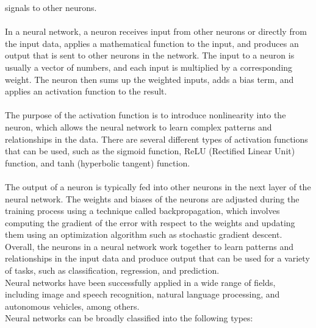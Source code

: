 signals to other neurons.\\
\\
In a neural network, a neuron receives input from other neurons or directly from the input data, applies a mathematical function to the input, and
produces an output that is sent to other neurons in the network. The input to a neuron is usually a vector of numbers, and each input is multiplied
by a corresponding weight. The neuron then sums up the weighted inputs, adds a bias term, and applies an activation function to the result.\\
\\
The purpose of the activation function is to introduce nonlinearity into the neuron, which allows the neural network to learn complex
patterns and relationships in the data. There are several different types of activation functions that can be used, such as the sigmoid function,
ReLU (Rectified Linear Unit) function, and tanh (hyperbolic tangent) function.\\
\\
The output of a neuron is typically fed into other neurons in the next layer of the neural network. The weights and biases of the neurons are
adjusted during the training process using a technique called backpropagation, which involves computing the gradient of the error with
respect to the weights and updating them using an optimization algorithm such as stochastic gradient descent.\\
Overall, the neurons in a neural network work together to learn patterns and relationships in the input data and produce
output that can be used for a variety of tasks, such as classification, regression, and prediction.\\
Neural networks have been successfully applied in a wide range of fields, including image and speech recognition, natural language processing, and autonomous
vehicles, among others.\\
Neural networks can be broadly classified into the following types:
